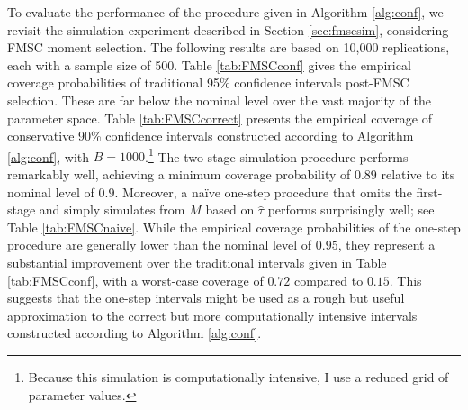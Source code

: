 To evaluate the performance of the procedure given in Algorithm \ref{alg:conf}, we revisit the simulation experiment described in Section \ref{sec:fmscsim}, considering FMSC moment selection. The following results are based on 10,000 replications, each with a sample size of 500. Table \ref{tab:FMSCconf} gives the empirical coverage probabilities of traditional 95\% confidence intervals post-FMSC selection. These are far below the nominal level over the vast majority of the parameter space. Table \ref{tab:FMSCcorrect} presents the empirical coverage of conservative 90\% confidence intervals constructed according to Algorithm \ref{alg:conf}, with $B=1000$.\footnote{Because this simulation is computationally intensive, I use a reduced grid of parameter values.} The two-stage simulation procedure performs remarkably well, achieving a minimum coverage probability of $0.89$ relative to its nominal level of $0.9$. Moreover, a na\"{i}ve one-step procedure that omits the first-stage and simply simulates from $M$ based on $\widehat{\tau}$ performs surprisingly well; see Table \ref{tab:FMSCnaive}. While the empirical coverage probabilities of the one-step procedure are generally lower than the nominal level of $0.95$, they represent a substantial improvement over the traditional intervals given in Table \ref{tab:FMSCconf}, with a worst-case coverage of $0.72$ compared to $0.15$. This suggests that the one-step intervals might be used as a rough but useful approximation to the correct but more computationally intensive intervals constructed according to Algorithm \ref{alg:conf}.

